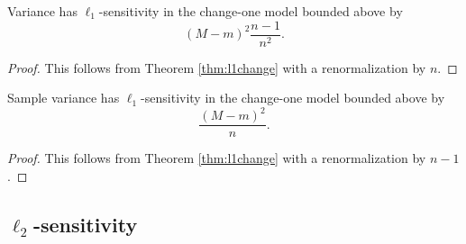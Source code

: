 \documentclass[11pt]{scrartcl} %
\begin{document}
\begin{corollary}
Variance has $\ell_1$-sensitivity in the change-one model bounded above by
$$ (M-m)^2 \frac{n-1}{n^2}. $$
\end{corollary}

\begin{proof}
This follows from Theorem \ref{thm:l1change} with a renormalization by $n$.
\end{proof}

\begin{corollary}
Sample variance has $\ell_1$-sensitivity in the change-one model bounded above by
$$ \frac{(M-m)^2 }{n}. $$
\end{corollary}

\begin{proof}
This follows from Theorem \ref{thm:l1change} with a renormalization by $n-1$.
\end{proof}

\subsection{$\ell_2$-sensitivity}

\end{document}
